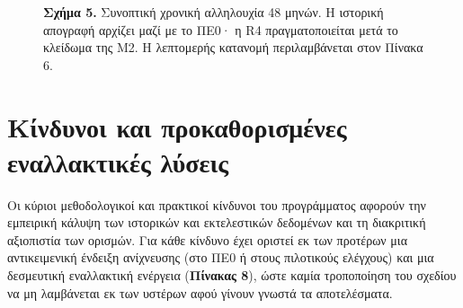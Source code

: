 \documentclass[11pt,a4paper]{article}
\newcommand{\figcap}[2]{\par\vspace{3pt}\begin{minipage}{0.95\linewidth}\footnotesize\textbf{#1} #2\end{minipage}\par}
\begin{document}
\begin{figure}[htbp]
\centering
{}
\figcap{Σχήμα 5.}{Συνοπτική χρονική αλληλουχία 48 μηνών. Η ιστορική απογραφή αρχίζει μαζί με το ΠΕ0· η R4 πραγματοποιείται μετά το κλείδωμα της M2. Η λεπτομερής κατανομή περιλαμβάνεται στον Πίνακα 6.}
\end{figure}

\section{Κίνδυνοι και προκαθορισμένες εναλλακτικές λύσεις}\label{ux3baux3afux3bdux3b4ux3c5ux3bdux3bfux3b9-ux3baux3b1ux3b9-ux3c0ux3c1ux3bfux3baux3b1ux3b8ux3bfux3c1ux3b9ux3c3ux3bcux3adux3bdux3b5ux3c2-ux3b5ux3bdux3b1ux3bbux3bbux3b1ux3baux3c4ux3b9ux3baux3adux3c2-ux3bbux3cdux3c3ux3b5ux3b9ux3c2}

Οι κύριοι μεθοδολογικοί και πρακτικοί κίνδυνοι του προγράμματος αφορούν την εμπειρική κάλυψη των ιστορικών και εκτελεστικών δεδομένων και τη διακριτική αξιοπιστία των ορισμών. Για κάθε κίνδυνο έχει οριστεί εκ των προτέρων μια αντικειμενική ένδειξη ανίχνευσης (στο ΠΕ0 ή στους πιλοτικούς ελέγχους) και μια δεσμευτική εναλλακτική ενέργεια (\textbf{Πίνακας 8}), ώστε καμία τροποποίηση του σχεδίου να μη λαμβάνεται εκ των υστέρων αφού γίνουν γνωστά τα αποτελέσματα.
\end{document}
